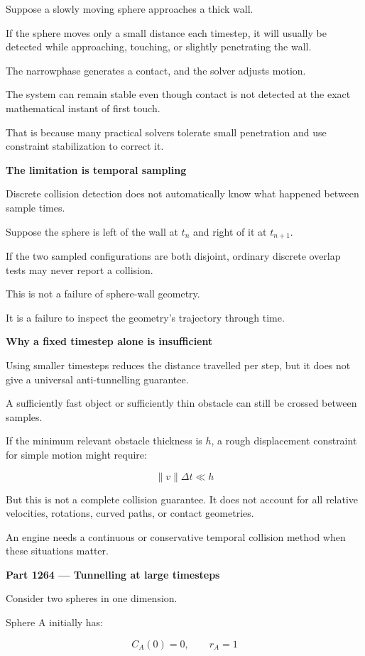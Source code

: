 Suppose a slowly moving sphere approaches a thick wall.

If the sphere moves only a small distance each timestep, it will usually be detected while approaching, touching, or slightly penetrating the wall.

The narrowphase generates a contact, and the solver adjusts motion.

The system can remain stable even though contact is not detected at the exact mathematical instant of first touch.

That is because many practical solvers tolerate small penetration and use constraint stabilization to correct it.

\textbf{The limitation is temporal sampling}

Discrete collision detection does not automatically know what happened between sample times.

Suppose the sphere is left of the wall at \(t_n\) and right of it at \(t_{n+1}\).

If the two sampled configurations are both disjoint, ordinary discrete overlap tests may never report a collision.

This is not a failure of sphere-wall geometry.

It is a failure to inspect the geometry's trajectory through time.

\textbf{Why a fixed timestep alone is insufficient}

Using smaller timesteps reduces the distance travelled per step, but it does not give a universal anti-tunnelling guarantee.

A sufficiently fast object or sufficiently thin obstacle can still be crossed between samples.

If the minimum relevant obstacle thickness is \(h\), a rough displacement constraint for simple motion might require:

\[
\|v\|\Delta t\ll h
\]

But this is not a complete collision guarantee. It does not account for all relative velocities, rotations, curved paths, or contact geometries.

An engine needs a continuous or conservative temporal collision method when these situations matter.

\textbf{Part 1264 --- Tunnelling at large timesteps}

Consider two spheres in one dimension.

Sphere A initially has:

\[
C_A(0)=0,\qquad r_A=1
\]

